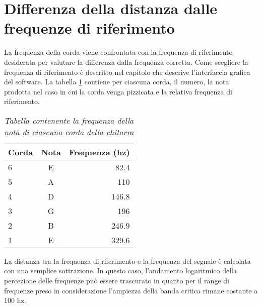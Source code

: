 \section{Differenza della distanza dalle frequenze di riferimento}\label{cap:distanza}

La frequenza della corda viene confrontata con la frequenza di riferimento desiderata per valutare la differenza dalla frequenza corretta.
Come scegliere la frequenza di riferimento è descritto nel capitolo che descrive l'interfaccia grafica del software.
La tabella \ref{tab:frequenze_riferimento} contiene per ciascuna corda, il numero, la nota prodotta nel caso in cui la corda venga pizzicata e la relativa frequenza di riferimento.

	\begin{table}[h]
	\center
	\begin{tabular}{|l|c|r|}
		\hline
		Corda	& 	Nota    & Frequenza (hz) \\
		\hline
		6	&	E	&	82.4     \\
		5	&	A	&	110      \\
		4	&	D	&	146.8    \\
		3	&	G	&	196      \\
		2	&	B	&	246.9    \\
		1	&	E	&	329.6    \\
		\hline
	\end{tabular}
	\caption{\textit{Tabella contenente la frequenza della nota di ciascuna corda della chitarra}}
	\label{tab:frequenze_riferimento}
	\end{table}

La distanza tra la frequenza di riferimento e la frequenza del segnale è calcolata con una semplice sottrazione.
In questo caso, l'andamento logaritmico della percezione delle frequenze può essere trascurato in quanto per il range di frequenze preso in considerazione l'ampiezza della banda critica rimane costante a 100 hz. 
